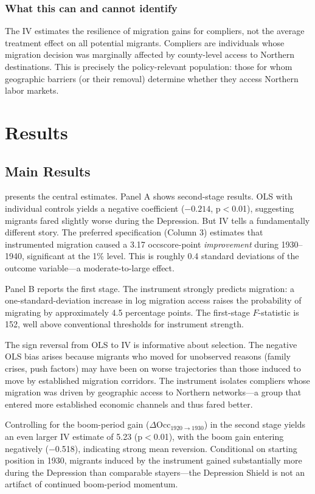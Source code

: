 \documentclass[12pt]{article}
\begin{document}
\subsubsection*{What this can and cannot identify} The IV estimates the resilience of migration gains for compliers, not the average treatment effect on all potential migrants. Compliers are individuals whose migration decision was marginally affected by county-level access to Northern destinations. This is precisely the policy-relevant population: those for whom geographic barriers (or their removal) determine whether they access Northern labor markets.

\section{Results}

\subsection{Main Results}

 presents the central estimates. Panel A shows second-stage results. OLS with individual controls yields a negative coefficient ($-0.214$, p$<$0.01), suggesting migrants fared slightly worse during the Depression. But IV tells a fundamentally different story. The preferred specification (Column 3) estimates that instrumented migration caused a 3.17 occscore-point \textit{improvement} during 1930--1940, significant at the 1\% level. This is roughly 0.4 standard deviations of the outcome variable---a moderate-to-large effect.

Panel B reports the first stage. The instrument strongly predicts migration: a one-standard-deviation increase in log migration access raises the probability of migrating by approximately 4.5 percentage points. The first-stage $F$-statistic is 152, well above conventional thresholds for instrument strength.

The sign reversal from OLS to IV is informative about selection. The negative OLS bias arises because migrants who moved for unobserved reasons (family crises, push factors) may have been on worse trajectories than those induced to move by established migration corridors. The instrument isolates compliers whose migration was driven by geographic access to Northern networks---a group that entered more established economic channels and thus fared better.

Controlling for the boom-period gain ($\Delta$Occ$_{1920 \rightarrow 1930}$) in the second stage yields an even larger IV estimate of 5.23 (p$<$0.01), with the boom gain entering negatively ($-$0.518), indicating strong mean reversion. Conditional on starting position in 1930, migrants induced by the instrument gained substantially more during the Depression than comparable stayers---the Depression Shield is not an artifact of continued boom-period momentum.
\end{document}
